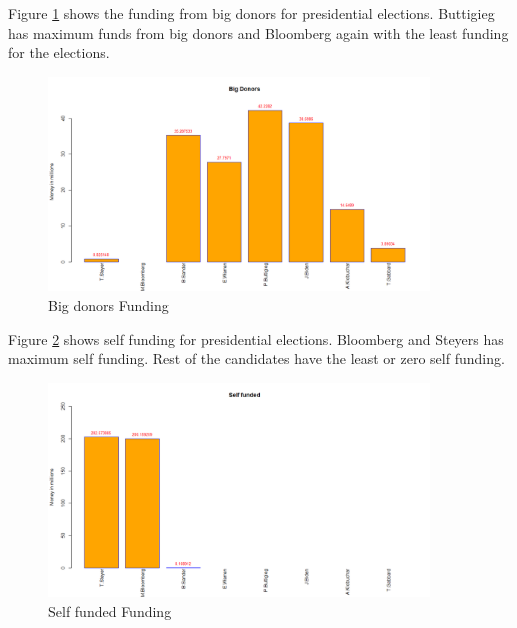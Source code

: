 Figure \ref{Bigdonor} shows the funding from big donors for presidential elections. Buttigieg has maximum funds from big donors and Bloomberg again with the least funding for the elections. 
\begin{figure}[H]
    \centering
    \includegraphics[width=0.9\textwidth]{figures/Bigdonor.png}
    \caption{Big donors Funding}
    \label{Bigdonor}
\end{figure}

Figure \ref{Selffunnded} shows self funding for presidential elections. Bloomberg and Steyers has maximum self funding. Rest of the candidates have the least or zero self funding. 
\begin{figure}[H]
    \centering
    \includegraphics[width=0.9\textwidth]{figures/Selffunnded.png}
    \caption{Self funded Funding}
    \label{Selffunnded}
\end{figure}

